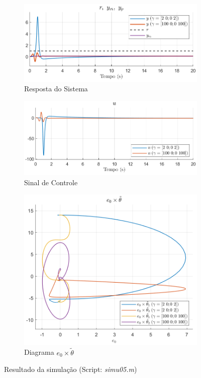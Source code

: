 \documentclass[10pt]{article}
\begin{document}
\begin{figure}[h!]
    \begin{subfigure}[b]{0.3\textwidth}
        \centering
        \includegraphics[width=\textwidth]{img/fig05c.png}
        \caption{Resposta do Sistema}
    \end{subfigure}
    \begin{subfigure}[b]{0.3\textwidth}
        \centering
        \includegraphics[width=\textwidth]{img/fig05e.png}
        \caption{Sinal de Controle}
    \end{subfigure}

    \begin{subfigure}[b]{0.3\textwidth}
        \centering
        \includegraphics[width=\textwidth]{img/fig05d.png}
        \caption{Diagrama $e_0 \times \tilde{\theta}$}
    \end{subfigure}

    \caption{Resultado da simulação (Script: \textit{simu05.m})}
    \label{fig:sim5}
\end{figure}
\end{document}
